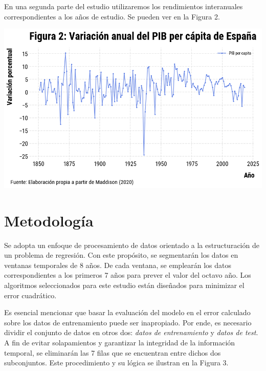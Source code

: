 \documentclass[12pt]{article}
\begin{document}
En una segunda parte del estudio utilizaremos los rendimientos interanuales correspondientes a los años de estudio. Se pueden ver en la Figura 2.

\begin{center}
\includegraphics[scale=0.65]{fig_2_varpibpc}
\end{center}


\section{Metodología}

Se adopta un enfoque de procesamiento de datos orientado a la estructuración de un problema de regresión. Con este propósito, se segmentarán los datos en ventanas temporales de 8 años. De cada ventana, se emplearán los datos correspondientes a los primeros 7 años para prever el valor del octavo año. Los algoritmos seleccionados para este estudio están diseñados para minimizar el error cuadrático.


Es esencial mencionar que basar la evaluación del modelo en el error calculado sobre los datos de entrenamiento puede ser inapropiado. Por ende, es necesario dividir el conjunto de datos en otros dos: \textit{datos de entrenamiento} y \textit{datos de test}. A fin de evitar solapamientos y garantizar la integridad de la información temporal, se eliminarán las 7 filas que se encuentran entre dichos dos subconjuntos. Este procedimiento y su lógica se ilustran en la Figura 3.

\begin{figure}[H]
\end{figure}
\end{document}
